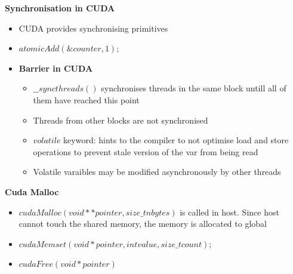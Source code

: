 \documentclass[10pt, landscape]{article}
\begin{document}
\begin{multicols}{4}
\textbf{Synchronisation in CUDA}
\begin{itemize}
    \item CUDA provides synchronising primitives
    \item $atomicAdd(\&counter, 1);$
    \item \textbf{Barrier in CUDA}
    \begin{itemize}
        \item $\_\_syncthreads()$ synchronises threads in the same block untill all of them have reached this point
        \item Threads from other blocks are not synchronised
        \item $volatile$ keyword: hints to the compiler to not optimise load and store operations to prevent stale version of the var from being read
        \item Volatile varaibles may be modified asynchronously by other threads
    \end{itemize}
\end{itemize}

\textbf{Cuda Malloc}
\begin{itemize}
    \item $cudaMalloc(void **pointer, size\_t nbytes)$ is called in host. Since host cannot touch the shared memory, the memory is allocated to global
    \item $cudaMemset(void *pointer, int value, size\_t count);$
    \item $cudaFree(void* pointer)$
\end{itemize}


\end{multicols}
\end{document}
